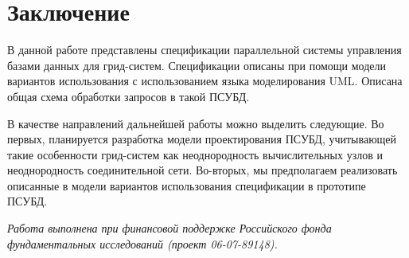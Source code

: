 \documentclass[11pt,oneside]{article}
\begin{document}
	\section{Заключение}\label{S_Conclusion}
	\par В данной работе представлены спецификации параллельной системы управления базами данных для грид-систем. Спецификации описаны при помощи модели вариантов использования с использованием языка моделирования UML. Описана общая схема обработки запросов в такой ПСУБД.
	\par В качестве направлений дальнейшей работы можно выделить следующие. Во первых, планируется разработка модели проектирования ПСУБД, учитывающей такие особенности грид-систем как неоднородность вычислительных узлов и неоднородность соединительной сети. Во-вторых, мы предполагаем реализовать описанные в модели вариантов использования спецификации в прототипе ПСУБД.
	\par{\it Работа выполнена при финансовой поддержке Российского фонда фундаментальных исследований (проект 06-07-89148).}
\end{document}

